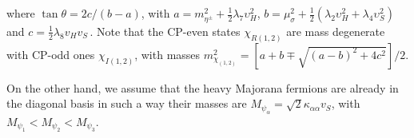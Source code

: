 \documentclass[12pt]{article}
\begin{document}
%
where $\tan\theta= 2c/(b-a)$, with $a = m^{2}_{\eta^{\pm}} + \frac{1}{2}\lambda_{7} \upsilon^{2}_{H}$, $b = \mu^{2}_{\sigma}+\frac{1}{2}(\lambda_{2} \upsilon^{2}_{H} + \lambda_{4} \upsilon^{2}_{S})$ and $c = \frac{1}{2}\lambda_8 v_{H} v_{S}$\,. Note that the CP-even  states $\chi_{R(1,2)}$ are mass degenerate with CP-odd ones $\chi_{I(1,2)}$, with masses $ m_{\chi_{(1,2)}}^{2}= [a + b \mp \sqrt{(a-b)^{2} + 4c^{2}}]/2$.   

%
%

On the other hand, we assume that the heavy Majorana fermions are already in the diagonal basis in such a way their masses are $M_{\psi_\alpha}=\sqrt{2}\kappa_{\alpha\alpha}v_S$, with $M_{\psi_1}<M_{\psi_2}<M_{\psi_3}$.
\end{document}
